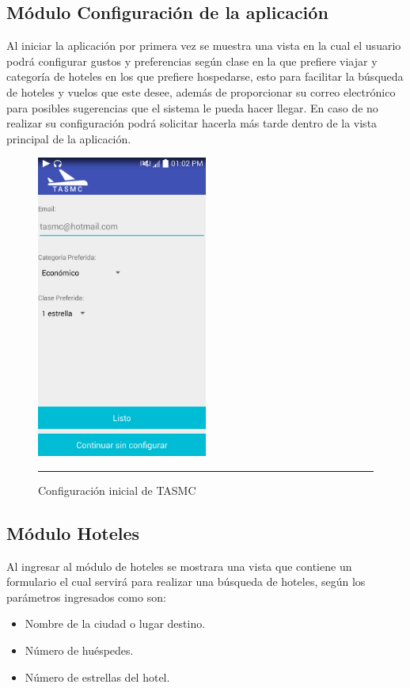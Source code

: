 \subsection{Módulo Configuración de la aplicación}
Al iniciar la aplicación por primera vez se muestra una vista en la cual el usuario podrá configurar gustos y preferencias según clase en la que prefiere viajar y categoría de hoteles en los que prefiere hospedarse, esto para facilitar la búsqueda de hoteles y vuelos que este desee, 
además de proporcionar su correo electrónico para posibles sugerencias que el sistema le pueda hacer llegar.
En caso de no realizar su configuración podrá solicitar hacerla más tarde dentro de la vista principal de la aplicación.
\begin{figure}[h]
	\centering
		\includegraphics[width=0.5\textwidth]{Figuras/configuracion.png}
		\rule{30em}{0.5pt}
	\caption[Configuración inicial de TASMC]{Configuración inicial de TASMC}
	\label{fig:configuracionTASMC}
\end{figure}
\clearpage

\subsection{Módulo Hoteles}
Al ingresar al módulo de hoteles se mostrara una vista que contiene un formulario el cual servirá para realizar una búsqueda de hoteles, según los parámetros ingresados como son:

\begin{itemize}
\item Nombre de la ciudad o lugar destino.
\item Número de huéspedes.
\item Número de estrellas del hotel.
\end{itemize}

